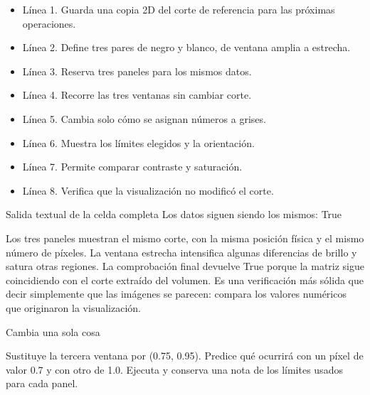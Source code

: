
\begin{itemize}

\item Línea 1. Guarda una copia 2D del corte de referencia para las próximas operaciones.

\item Línea 2. Define tres pares de negro y blanco, de ventana amplia a estrecha.

\item Línea 3. Reserva tres paneles para los mismos datos.

\item Línea 4. Recorre las tres ventanas sin cambiar corte.

\item Línea 5. Cambia solo cómo se asignan números a grises.

\item Línea 6. Muestra los límites elegidos y la orientación.

\item Línea 7. Permite comparar contraste y saturación.

\item Línea 8. Verifica que la visualización no modificó el corte.

\end{itemize}

\begin{Salida}{Salida textual de la celda completa}
Los datos siguen siendo los mismos: True
\end{Salida}



Los tres paneles muestran el mismo corte, con la misma posición física y el mismo número de píxeles. La ventana estrecha intensifica algunas diferencias de brillo y satura otras regiones. La comprobación final devuelve True porque la matriz sigue coincidiendo con el corte extraído del volumen. Es una verificación más sólida que decir simplemente que las imágenes se parecen: compara los valores numéricos que originaron la visualización.



\begin{Practica}{Cambia una sola cosa}

Sustituye la tercera ventana por (0.75, 0.95). Predice qué ocurrirá con un píxel de valor 0.7 y con otro de 1.0. Ejecuta y conserva una nota de los límites usados para cada panel.


\end{Practica}

